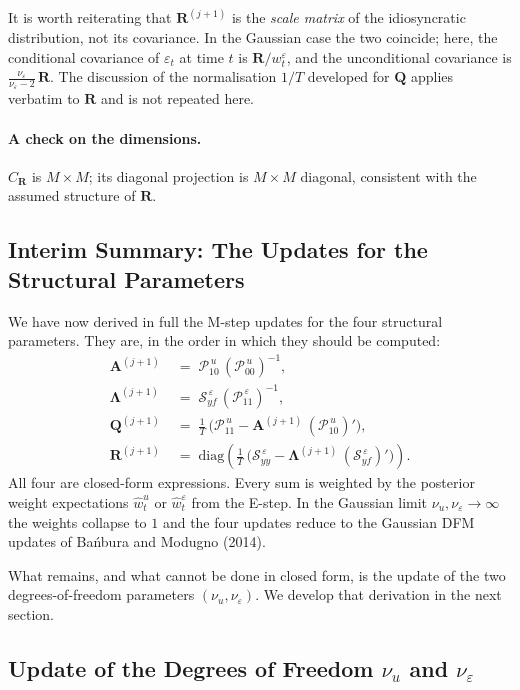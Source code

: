 \documentclass[11pt, a4paper, oneside]{article}
\newcommand{\mL}{\boldsymbol{\Lambda}}
\newcommand{\mA}{\mathbf{A}}
\newcommand{\mR}{\mathbf{R}}
\newcommand{\mQ}{\mathbf{Q}}
\begin{document}
It is worth reiterating that $\mR^{(j+1)}$ is the \emph{scale matrix}
of the idiosyncratic distribution, not its covariance. In the
Gaussian case the two coincide; here, the conditional covariance of
$\varepsilon_t$ at time $t$ is $\mR / w^\varepsilon_t$, and the
unconditional covariance is $\tfrac{\nu_\varepsilon}{\nu_\varepsilon - 2}\, \mR$.
The discussion of the normalisation $1/T$ developed for $\mQ$ applies verbatim to $\mR$ and is not
repeated here.

\paragraph{A check on the dimensions.}
$C_{\mR}$ is $M \times M$; its diagonal projection is $M \times M$
diagonal, consistent with the assumed structure of $\mR$.

\subsection{Interim Summary: The Updates for the Structural Parameters}

We have now derived in full the M-step updates for the four structural
parameters. They are, in the order in which they should be computed:
\begin{align*}
\mA^{(j+1)}            \;&=\; \mathcal{P}_{10}^{\,u}\, (\mathcal{P}_{00}^{\,u})^{-1}, \\[3pt]
\mL^{(j+1)} \;&=\; \mathcal{S}_{yf}^{\,\varepsilon}\, (\mathcal{P}_{11}^{\,\varepsilon})^{-1}, \\[3pt]
\mQ^{(j+1)}            \;&=\; \tfrac{1}{T}\, \big(\mathcal{P}_{11}^{\,u} - \mA^{(j+1)}\, (\mathcal{P}_{10}^{\,u})'\big), \\[3pt]
\mR^{(j+1)}            \;&=\; \mathrm{diag}\!\left(\tfrac{1}{T}\, \big(\mathcal{S}_{yy}^{\,\varepsilon} - \mL^{(j+1)}\, (\mathcal{S}_{yf}^{\,\varepsilon})'\big)\right).
\end{align*}
All four are closed-form expressions. Every sum is weighted by the
posterior weight expectations $\hat{w}^u_t$ or $\hat{w}^\varepsilon_t$
from the E-step. In the Gaussian limit
$\nu_u, \nu_\varepsilon \to \infty$ the weights collapse to $1$ and
the four updates reduce to the Gaussian DFM updates of Bańbura and
Modugno (2014).

What remains, and what cannot be done in closed form, is the update
of the two degrees-of-freedom parameters $(\nu_u, \nu_\varepsilon)$.
We develop that derivation in the next section.

\subsection{Update of the Degrees of Freedom $\nu_u$ and $\nu_\varepsilon$}
\label{subsec:update-nu}
\end{document}
